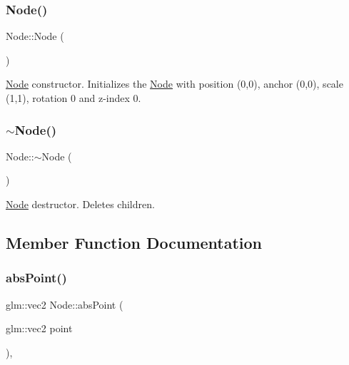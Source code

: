 \subsubsection{\texorpdfstring{Node()}{Node()}}
{\footnotesize\ttfamily Node\+::\+Node (\begin{DoxyParamCaption}{ }\end{DoxyParamCaption})}



\mbox{\hyperlink{classsage_1_1Node}{Node}} constructor. Initializes the \mbox{\hyperlink{classsage_1_1Node}{Node}} with position (0,0), anchor (0,0), scale (1,1), rotation 0 and z-\/index 0. 

\mbox{\label{classsage_1_1Node_aa0840c3cb5c7159be6d992adecd2097c}} 
\subsubsection{\texorpdfstring{$\sim$Node()}{~Node()}}
{\footnotesize\ttfamily Node\+::$\sim$\+Node (\begin{DoxyParamCaption}{ }\end{DoxyParamCaption})\hspace{0.3cm}{\ttfamily [virtual]}}



\mbox{\hyperlink{classsage_1_1Node}{Node}} destructor. Deletes children. 



\subsection{Member Function Documentation}
\mbox{\label{classsage_1_1Node_a1c8fbbf37b6e9cf6c7f5e0a4ae4a73cb}} 
\subsubsection{\texorpdfstring{absPoint()}{absPoint()}}
{\footnotesize\ttfamily glm\+::vec2 Node\+::abs\+Point (\begin{DoxyParamCaption}\item[{glm\+::vec2}]{point }\end{DoxyParamCaption})\hspace{0.3cm}{\ttfamily [protected]}, {\ttfamily [virtual]}}



